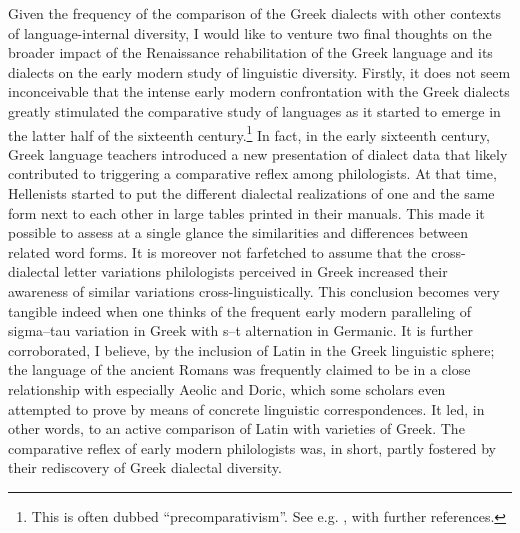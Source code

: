 Given the frequency of the comparison of the Greek dialects with other contexts of language-internal diversity, I would like to venture two final thoughts on the broader impact of the Renaissance rehabilitation of the Greek language and its dialects on the early modern study of linguistic diversity. Firstly, it does not seem inconceivable that the intense early modern confrontation with the Greek dialects greatly stimulated the comparative study of languages as it started to emerge in the latter half of the sixteenth century.\footnote{This is often dubbed “precomparativism”. See e.g. \citet{Considine2010b}, with further references.} In fact, in the early sixteenth century, Greek language teachers introduced a new presentation of dialect data that likely contributed to triggering a comparative reflex among philologists. At that time, Hellenists started to put the different dialectal realizations of one and the same form next to each other in large tables printed in their manuals. This made it possible to assess at a single glance the similarities and differences between related word forms. It is moreover not farfetched to assume that the cross-dialectal letter variations philologists perceived in Greek increased their awareness of similar variations cross-linguistically. This conclusion becomes very tangible indeed when one thinks of the frequent early modern paralleling of sigma–tau variation in Greek with s–t alternation in Germanic. It is further corroborated, I believe, by the inclusion of Latin in the Greek linguistic sphere; the language of the ancient Romans was frequently claimed to be in a close relationship with especially Aeolic and Doric, which some scholars even attempted to prove by means of concrete linguistic correspondences. It led, in other words, to an active comparison of Latin with varieties of Greek. The comparative reflex of early modern philologists was, in short, partly fostered by their rediscovery of Greek dialectal diversity.

